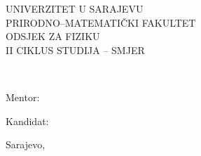 \thispagestyle{empty}
\makeatletter

\begin{figure}[t]
	\centering
	\begin{minipage}{.8\textwidth}
		\centering
		{\DoubleSpacing
			\MakeUppercase{\large Univerzitet u Sarajevu}\\
			\MakeUppercase{\large Prirodno--matematički fakultet}\\
			\MakeUppercase{\large Odsjek za fiziku}\\
			\MakeUppercase{\large II ciklus studija -- smjer \@smjer}\\
		}
	\end{minipage}
\end{figure}
\vspace*{\fill}
\begin{center}
	{\LARGE\bfseries\MakeUppercase{\@naslov}\\}
	\vspace{1em}
	{\large\MakeUppercase{\@podnaslov}}
\end{center}
\vspace*{\fill}
\begin{figure}[b]
	\centering
	\begin{minipage}[t]{\textwidth}
		\begin{minipage}[t]{0.66\textwidth}
			\large Mentor:\\
			\@profesor
		\end{minipage}
		\begin{minipage}[t]{0.33\textwidth}
			\large Kandidat:\\
			\@student
		\end{minipage}
	\end{minipage}

	\vspace{15mm}
	{\large Sarajevo, \@datum}
\end{figure}

\makeatother
\cleardoublepage
